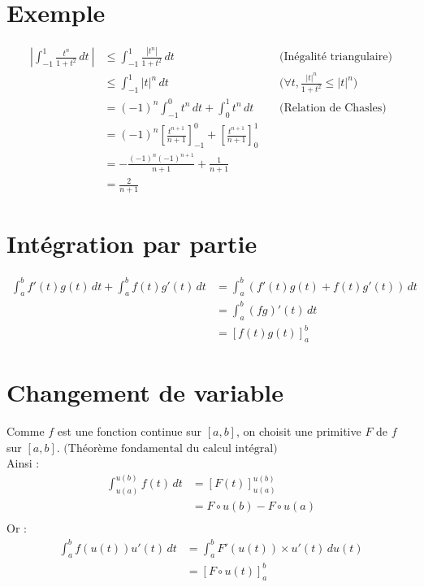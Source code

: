 \documentclass[../main.tex]{subfiles}
\begin{document}
\section{Exemple}
\begin{align*}
    \left| \int_{-1}^{1} \frac{t^n}{1 + t^2} \,dt\ \right| &\leq \int_{-1}^{1} \frac{|t^n|}{1 + t^2} \,dt\ && \text{(Inégalité triangulaire)}\\
    &\leq \int_{-1}^{1} |t|^n \,dt\ && \text{(} \forall t, \frac{|t|^n}{1 + t^2} \leq |t|^n \text{)}\\
    &= (-1)^n \int_{-1}^{0} t^n \,dt + \int_{0}^{1} t^n \,dt\ && \text{(Relation de Chasles)}\\
    &= (-1)^n \left[ \frac{t^{n+1}}{n+1} \right]_{-1}^{0} + \left[ \frac{t^{n+1}}{n+1} \right]_{0}^{1}\ \\
    &= -\frac{(-1)^n(-1)^{n+1}}{n + 1} + \frac{1}{n + 1}\ \\
    &= \frac{2}{n + 1}
\end{align*}

\setcounter{section}{68}
\section{Intégration par partie}
\begin{align*}
    \int_{a}^{b} f'(t)g(t) \,dt + \int_{a}^{b} f(t)g'(t) \,dt &= \int_{a}^{b} (f'(t)g(t) + f(t)g'(t)) \,dt \\
    &= \int_{a}^{b} (fg)'(t) \,dt \\
    &= [f(t)g(t)]_{a}^{b} 
\end{align*}

\section{Changement de variable}
Comme $f$ est une fonction continue sur $[a,b]$, on choisit une primitive $F$ de $f$ sur $[a,b]$. $\text{(Théorème fondamental du calcul intégral)}$ \\
Ainsi : 
\begin{align*}
    \int_{u(a)}^{u(b)} f(t) \,dt &= \left[ F(t) \right]_{u(a)}^{u(b)} \\
    &= F \circ u(b) - F \circ u(a) \\
\end{align*}
Or : 
\begin{align*}
    \int_{a}^{b} f(u(t))u'(t) \,dt &= \int_{a}^{b} F'(u(t)) \times u'(t) \,du(t) \\
    &= \left[ F \circ u(t) \right]_a^b 
\end{align*}
\end{document}
